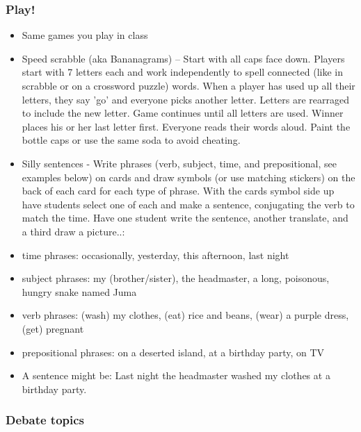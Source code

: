 \documentclass[12pt,a4paper]{report}
\begin{document}
\subsubsection{Play!}
\begin{itemize}
\item{Same games you play in class}

\item{Speed scrabble (aka Bananagrams) – Start with all caps face down. Players start with 7 letters each and work independently to spell connected (like in scrabble or on a crossword puzzle) words. When a player has used up all their letters, they say 'go' and everyone picks another letter. Letters are rearraged to include the new letter. Game continues until all letters are used. Winner places his or her last letter first. Everyone reads their words aloud. Paint the bottle caps or use the same soda to avoid cheating.}

\item{Silly sentences - Write phrases (verb, subject, time, and prepositional, see examples below) on cards and draw symbols (or use matching stickers) on the back of each card for each type of phrase. With the cards symbol side up have students select one of each and make a sentence, conjugating the verb to match the time. Have one student write the sentence, another translate, and a third draw a picture..:}

\item{time phrases: occasionally, yesterday, this afternoon, last night}

\item{subject phrases: my (brother/sister), the headmaster, a long, poisonous, hungry snake named Juma}

\item{verb phrases: (wash) my clothes, (eat) rice and beans, (wear) a purple dress, (get) pregnant}

\item{prepositional phrases: on a deserted island, at a birthday party, on TV}

\item{A sentence might be: Last night the headmaster washed my clothes at a birthday party.}

\end{itemize}

\subsubsection{Debate topics}
\end{document}
